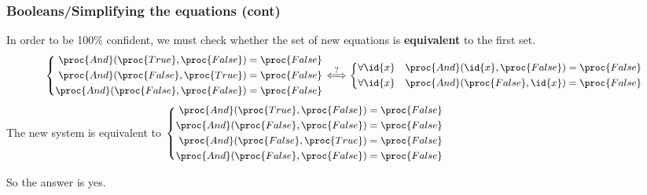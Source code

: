 %
\begin{frame}
\frametitle{Booleans/Simplifying the equations (cont)}

In order to be 100\% confident, we must check whether the set of new
equations is \textbf{equivalent} to the first set.
\[\small
\left\{
\begin{aligned}
\proc{And} (\proc{True}, \proc{False}) &= \proc{False}\\
\proc{And} (\proc{False}, \proc{True}) &= \proc{False}\\
\proc{And} (\proc{False}, \proc{False}) &= \proc{False}
\end{aligned}
\right.
\stackrel{?}{\Longleftrightarrow}
\left\{
\begin{aligned}
\forall \id{x} \quad \proc{And} (\id{x}, \proc{False}) &= \proc{False}\\
\forall \id{x} \quad \proc{And} (\proc{False}, \id{x}) &= \proc{False}
\end{aligned}
\right.
\]
The new system is equivalent to
\(\small
\left\{
\begin{aligned}
\proc{And} (\proc{True}, \proc{False}) &= \proc{False}\\
\proc{And} (\proc{False}, \proc{False}) &= \proc{False}\\
\proc{And} (\proc{False}, \proc{True}) &= \proc{False}\\
\proc{And} (\proc{False}, \proc{False}) &= \proc{False}
\end{aligned}
\right.
\)

So the answer is yes.

\end{frame}

